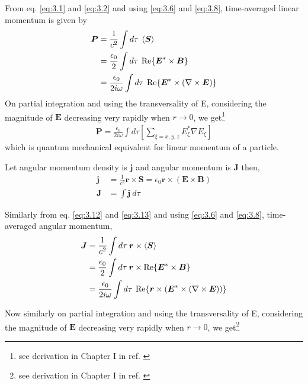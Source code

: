 \documentclass[11pt,a4paper]{article}
\numberwithin{equation}{section}
\begin{document}
From eq. \ref{eq:3.1} and \ref{eq:3.2} and using \ref{eq:3.6} and \ref{eq:3.8}, time-averaged linear momentum is given by
\begin{align}
	\boldsymbol{P} &= \frac{1}{c^2}\int d\tau\: \expval{\boldsymbol{S}}\\
	&=\frac{\epsilon_0}{2}\int d\tau \:\Re{\boldsymbol{E}^\ast \times \boldsymbol{B}}\nonumber\\
	&= \frac{\epsilon_0}{2i\omega}\int d\tau\: \Re{\boldsymbol{E}^\ast \times (\nabla\times\boldsymbol{E})} 
\end{align}
On partial integration and using the transversality of E, considering the magnitude of $\boldsymbol{E}$ decreasing very rapidly when $r\to0$, \cite{enk nien 92} we get\footnote{see derivation in Chapter I in ref. \cite{CCT}}
\begin{align}
	\boldsymbol{P}= \frac{\epsilon_0}{2i\omega}\int d\tau \left[\sum_{\xi=x,y,z}E_\xi^\ast\nabla E_\xi\right]
\end{align}
which is quantum mechanical equivalent for linear momentum of a particle.


Let angular momentum density is $\boldsymbol{j}$ and angular momentum is $\boldsymbol{J}$ then,
\begin{align}
	\boldsymbol{j} &= \frac{1}{c^2}\boldsymbol{r}\times\boldsymbol{S} = \epsilon_0 \boldsymbol{r}\times(\boldsymbol{E} \times \boldsymbol{B})\label{eq:3.12}\\
	\boldsymbol{J} &= \int \boldsymbol{j} \:d\tau\label{eq:3.13}
\end{align}

Similarly from eq. \ref{eq:3.12} and \ref{eq:3.13} and using \ref{eq:3.6} and \ref{eq:3.8}, time-averaged angular momentum, 
\begin{align}
	\boldsymbol{J} &= \frac{1}{c^2}\int d\tau\: \boldsymbol{r}\times\expval{\boldsymbol{S}}\\
	&=\frac{\epsilon_0}{2}\int d\tau \:\boldsymbol{r}\times\Re{\boldsymbol{E}^\ast \times \boldsymbol{B}}\nonumber\\
	&= \frac{\epsilon_0}{2i\omega}\int d\tau\: \Re{\boldsymbol{r}\times\left(\boldsymbol{E}^\ast \times (\nabla\times\boldsymbol{E})\right)}
\end{align}

Now similarly on partial integration and using the transversality of E, considering the magnitude of $\boldsymbol{E}$ decreasing very rapidly when $r\to0$, \cite{enk nien 92}\cite{allen 99} we get\footnote{see derivation in Chapter I in ref. \cite{CCT}}
\end{document}
